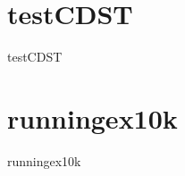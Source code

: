 \section{testCDST}
\label{sec:dataSets:testCDST}
\begin{dataSetDescription}{testCDST}
\end{dataSetDescription}

\section{runningex10k}
\label{sec:dataSets:runningex10k}
\begin{dataSetDescription}{runningex10k}
\end{dataSetDescription}

